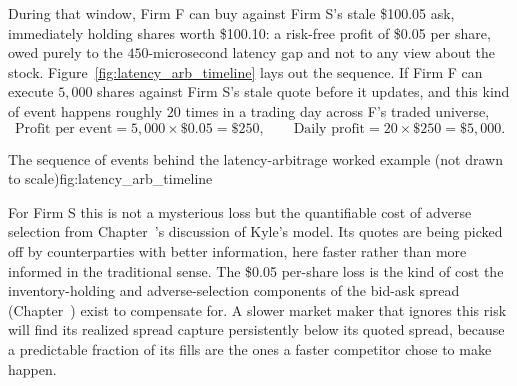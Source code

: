 \documentclass[../ai_in_finance]{subfiles}
\begin{document}
During that window, Firm F can buy against Firm S's stale \$100.05 ask, immediately holding shares worth \$100.10: a risk-free profit of \$0.05 per share, owed purely to the $450$-microsecond latency gap and not to any view about the stock. Figure~\ref{fig:latency_arb_timeline} lays out the sequence. If Firm F can execute $5{,}000$ shares against Firm S's stale quote before it updates, and this kind of event happens roughly $20$ times in a trading day across F's traded universe,
\begin{equation*}
\text{Profit per event} = 5{,}000 \times \$0.05 = \$250, \qquad \text{Daily profit} = 20 \times \$250 = \$5{,}000.
\end{equation*}

\begin{bookfigure}[htbp]{The sequence of events behind the latency-arbitrage worked example (not drawn to scale)}{fig:latency_arb_timeline}
\end{bookfigure}

For Firm S this is not a mysterious loss but the quantifiable cost of adverse selection from Chapter~'s discussion of Kyle's model. Its quotes are being picked off by counterparties with better information, here faster rather than more informed in the traditional sense. The \$0.05 per-share loss is the kind of cost the inventory-holding and adverse-selection components of the bid-ask spread (Chapter~) exist to compensate for. A slower market maker that ignores this risk will find its realized spread capture persistently below its quoted spread, because a predictable fraction of its fills are the ones a faster competitor chose to make happen.
\end{document}
